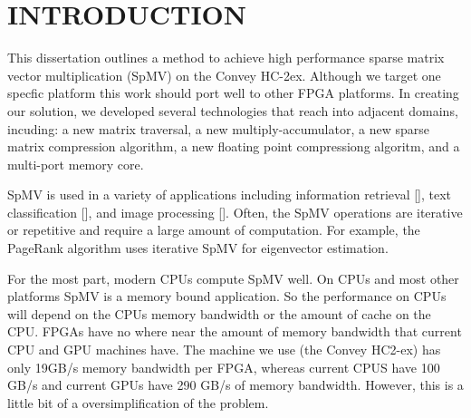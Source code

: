 \chapter{INTRODUCTION}
\label{chp:introduction}
This dissertation outlines a method to achieve high performance sparse matrix vector multiplication (SpMV) on the Convey HC-2ex. Although we target one specfic platform this work should port well to other FPGA platforms. In creating our solution, we developed several technologies that reach into adjacent domains, incuding: a new matrix traversal, a new multiply-accumulator, a new sparse matrix compression algorithm, a new floating point compressiong algoritm, and a multi-port memory core.

\par SpMV is used in a variety of applications including information retrieval [\cite{prelim:page}], text classification [\cite{prelim:townsend2}], and image processing [\cite{prelim:wang}]. Often, the SpMV operations are iterative or repetitive and require a large amount of computation. For example, the PageRank algorithm uses iterative SpMV for eigenvector estimation.

\par For the most part, modern CPUs compute SpMV well. On CPUs and most other platforms SpMV is a memory bound application. So the performance on CPUs will depend on the CPUs memory bandwidth or the amount of cache on the CPU. FPGAs have no where near the amount of memory bandwidth that current CPU and GPU machines have. The machine we use (the Convey HC2-ex) has only 19GB/s memory bandwidth per FPGA, whereas current CPUS have 100 GB/s and current GPUs have 290 GB/s of memory bandwidth. However, this is a little bit of a oversimplification of the problem.

